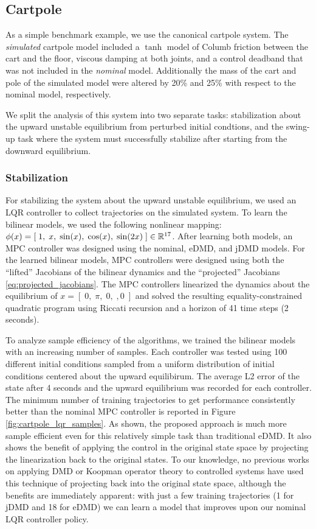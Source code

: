 \documentclass{article}
\begin{document}
\subsection{Cartpole}
As a simple benchmark example, we use the canonical cartpole system. The \textit{simulated}
cartpole model included a $\tanh$ model of Columb friction between the cart and the 
floor, viscous damping at both joints, and a control deadband that was not included in the 
\textit{nominal} model. Additionally the mass of the cart and pole of the simulated model 
were altered by 20\% and 25\% with respect to the nominal model, respectively. 

We split the analysis of this system into two separate tasks: stabilization about the upward
unstable equilibrium from perturbed initial condtions, and the swing-up task where the 
system must successfully stabilize after starting from the downward equilibrium.

\subsubsection{Stabilization}

For stabilizing the system about the upward unstable equilibrium, we used an LQR controller
to collect trajectories on the simulated system. To learn
the bilinear models, we used the following nonlinear mapping: $\phi(x) = [\; 1,\; x,\;
\sin(x),\; \cos(x),\; \sin(2x)\; ] \in \mathbb{R}^{17}$.  After learning both models, an MPC
controller was designed using the nominal, eDMD, and jDMD models. For the learned bilinear
models, MPC controllers were designed using both the ``lifted'' Jacobians of the bilinear 
dynamics and the ``projected'' Jacobians \eqref{eq:projected_jacobians}. The MPC controllers
linearized the dynamics about the equilibrium of $x = [\;0,\; \pi,\; 0,\;, 0\;]$ and solved
the resulting equality-constrained quadratic program using Riccati recursion and a horizon
of 41 time steps (2 seconds). 

To analyze sample efficiency of the algorithms, we trained the bilinear models with an 
increasing number of samples. Each controller was tested using 100 different initial
conditions sampled from a uniform distribution of initial conditions centered about the 
upward equilibirum. The average L2 error of the state after 4 seconds and the upward 
equilibrium was recorded for each controller. The minimum number of training trajectories to
get performance consistently better than the nominal MPC controller is reported in Figure 
\ref{fig:cartpole_lqr_samples}. As shown, the proposed approach is much more sample
efficient even for this relatively simple task than traditional eDMD. It also shows the
benefit of applying the control in the original state space by projecting the linearization
back to the original states. To our knowledge, no previous works on applying DMD or Koopman
operator theory to controlled systems have used this technique of projecting back into the
original state space, although the benefits are immediately apparent: with just a few
training trajectories (1 for jDMD and 18 for eDMD) we can learn a model that improves upon
our nominal LQR controller policy.
\end{document}
